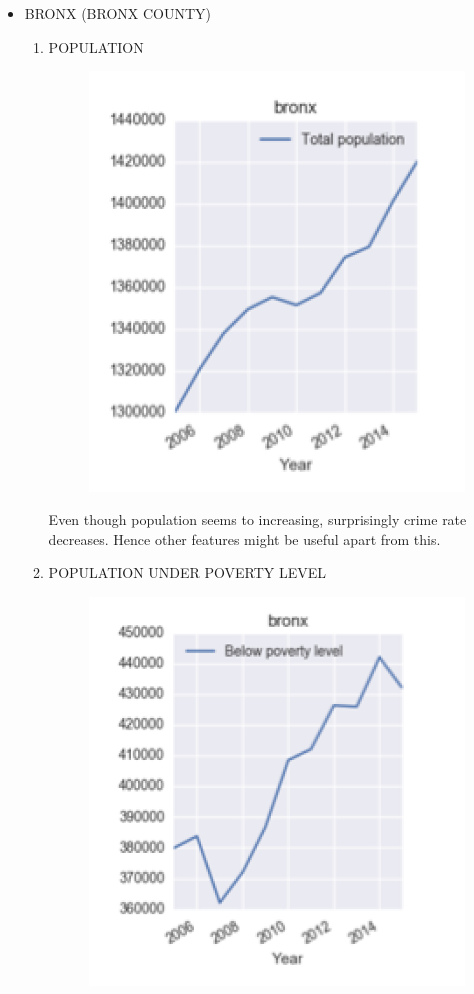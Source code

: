 \documentclass{article}
\begin{document}
\begin{itemize}
\item  BRONX (BRONX COUNTY)
\begin{enumerate}[label=(\alph*)]

\item POPULATION

\begin{figure}[H]
\centering
\includegraphics[scale=1]{BronxPopulation.png}
\end{figure}

Even though population seems to increasing, surprisingly crime rate decreases. Hence other features might be useful apart from this.

\item POPULATION UNDER POVERTY LEVEL

\begin{figure}[H]
\centering
\includegraphics[scale=1]{BronxPoverty.png}
\end{figure}


\end{enumerate}
\end{itemize}
\end{document}
